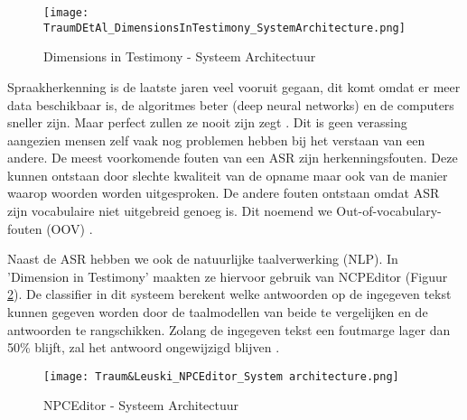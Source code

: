 \begin{figure}[h]
    \texttt{[image: TraumDEtAl\_DimensionsInTestimony\_SystemArchitecture.png]}
    \caption{Dimensions in Testimony - Systeem Architectuur \autocite{Traum2015}}
    \label{fig:DiTArchitecture}
\end{figure}

Spraakherkenning is de laatste jaren veel vooruit gegaan, dit komt omdat er meer data beschikbaar is, de algoritmes beter (deep neural networks) en de computers sneller zijn. Maar perfect zullen ze nooit zijn zegt \textcite{Hessen2020}. Dit is geen verassing aangezien mensen zelf vaak nog problemen hebben bij het verstaan van een andere. De meest voorkomende fouten van een ASR zijn herkenningsfouten. Deze kunnen ontstaan door slechte kwaliteit van de opname maar ook van de manier waarop woorden worden uitgesproken. De andere fouten ontstaan omdat ASR zijn vocabulaire niet uitgebreid genoeg is. Dit noemend we Out-of-vocabulary-fouten (OOV) \autocite{Hessen2020}.

Naast de ASR hebben we ook de natuurlijke taalverwerking (NLP). In 'Dimension in Testimony' maakten ze hiervoor gebruik van NCPEditor (Figuur \ref{fig:NPCEArchitecture}). De classifier in dit systeem berekent welke antwoorden op de ingegeven tekst kunnen gegeven worden door de taalmodellen van beide te vergelijken en de antwoorden te rangschikken. Zolang de ingegeven tekst een foutmarge lager dan 50\% blijft, zal het antwoord ongewijzigd blijven \autocite{Leuski2010}.

\begin{figure}[h]
    \texttt{[image: Traum\&Leuski\_NPCEditor\_System architecture.png]}
    \caption{NPCEditor - Systeem Architectuur \autocite{Leuski2010}}
    \label{fig:NPCEArchitecture}
\end{figure}

%
%
%
%

